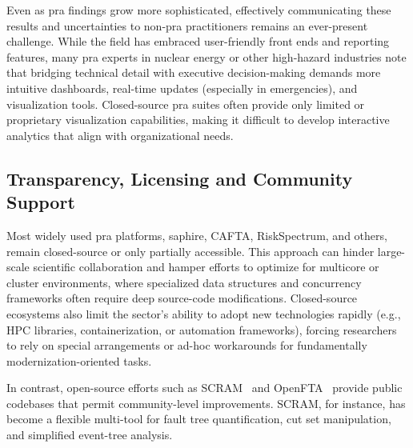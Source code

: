 Even as \acrshort{pra} findings grow more sophisticated, effectively communicating these results and uncertainties to non-\acrshort{pra} practitioners remains an ever-present challenge. While the field has embraced user-friendly front ends and reporting features, many \acrshort{pra} experts in nuclear energy or other high-hazard industries note that bridging technical detail with executive decision-making demands more intuitive dashboards, real-time updates (especially in emergencies), and visualization tools. Closed-source \acrshort{pra} suites often provide only limited or proprietary visualization capabilities, making it difficult to develop interactive analytics that align with organizational needs.

\subsection{Transparency, Licensing and Community Support}

Most widely used \acrshort{pra} platforms, \acrshort{saphire}, CAFTA, RiskSpectrum, and others, remain closed-source or only partially accessible. This approach can hinder large-scale scientific collaboration and hamper efforts to optimize for multicore or cluster environments, where specialized data structures and concurrency frameworks often require deep source-code modifications. Closed-source ecosystems also limit the sector’s ability to adopt new technologies rapidly (e.g., HPC libraries, containerization, or automation frameworks), forcing researchers to rely on special arrangements or ad-hoc workarounds for fundamentally modernization-oriented tasks.

In contrast, open-source efforts such as SCRAM~\cite{scram} and OpenFTA~\cite{opensource_fta_tools} provide public codebases that permit community-level improvements. SCRAM, for instance, has become a flexible multi-tool for fault tree quantification, cut set manipulation, and simplified event-tree analysis.

